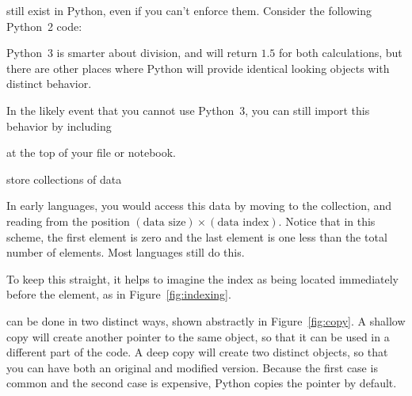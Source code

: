 \documentclass[justified, nobib]{tufte-handout}
\begin{document}
\vspace{5mm}

 still exist in Python, even if you can't enforce them.
Consider the following Python~2 code:

Python~3 is smarter about division, and will return $1.5$ for both calculations, but there are other places where Python will provide identical looking objects with distinct behavior.

\noindent
In the likely event that you cannot use Python~3, you can still import this behavior by including

\hspace{25pt}

\noindent
at the top of your file or notebook.

 store collections of data


\noindent
In early languages, you would access this data by moving to the collection, and reading from the position $(\text{data size}) \times (\text{data index})$.
Notice that in this scheme, the first element is zero and the last element is one less than the total number of elements.
Most languages still do this.



\begin{marginfigure}
    \def\svgwidth{140pt}{}
    \caption{%
    How to count in Python.
    Shaded elements correspond to those selected by indices [1:3]}
\label{fig:indexing}
\end{marginfigure}

\noindent
To keep this straight, it helps to imagine the index as being located immediately before the element, as in Figure~\ref{fig:indexing}.

\smallskip

 can be done in two distinct ways, shown abstractly in Figure~\ref{fig:copy}.
A shallow copy will create another pointer to the same object, so that it can be used in a different part of the code.
A deep copy will create two distinct objects, so that you can have both an original and modified version.
Because the first case is common and the second case is expensive, Python copies the pointer by default.
\begin{marginfigure}
    \vspace*{\fill}
    \centering

    \def\svgwidth{75pt}

    \vspace*{\fill}
    \bigskip
    \def\svgwidth{140pt}
  \caption{%
The finger pointing at the moon is not the moon}
\label{fig:copy}
\end{marginfigure}

\end{document}
